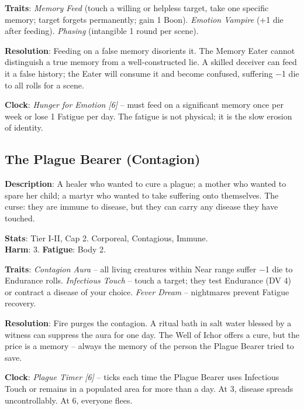 \noindent\textbf{Traits}: 
\emph{Memory Feed} (touch a willing or helpless target, take one specific memory; target forgets permanently; gain 1 Boon). \emph{Emotion Vampire} (+1 die after feeding). \emph{Phasing} (intangible 1 round per scene).

\noindent\textbf{Resolution}: Feeding on a false memory disorients it. The Memory Eater cannot distinguish a true memory from a well-constructed lie. A skilled deceiver can feed it a false history; the Eater will consume it and become confused, suffering −1 die to all rolls for a scene.

\noindent\textbf{Clock}: \emph{Hunger for Emotion [6]} -- must feed on a significant memory once per week or lose 1 Fatigue per day. The fatigue is not physical; it is the slow erosion of identity.


\subsection*{The Plague Bearer (Contagion)}

\noindent\textbf{Description}: A healer who wanted to cure a plague; a mother who wanted to spare her child; a martyr who wanted to take suffering onto themselves. The curse: they are immune to disease, but they can carry any disease they have touched.

\noindent\textbf{Stats}: Tier I-II, Cap 2. Corporeal, Contagious, Immune.\\
\textbf{Harm}: 3. \textbf{Fatigue}: Body 2.

\noindent\textbf{Traits}: 
\emph{Contagion Aura} -- all living creatures within Near range suffer −1 die to Endurance rolls. \emph{Infectious Touch} -- touch a target; they test Endurance (DV 4) or contract a disease of your choice. \emph{Fever Dream} -- nightmares prevent Fatigue recovery.

\noindent\textbf{Resolution}: Fire purges the contagion. A ritual bath in salt water blessed by a witness can suppress the aura for one day. The Well of Ichor offers a cure, but the price is a memory -- always the memory of the person the Plague Bearer tried to save.

\noindent\textbf{Clock}: \emph{Plague Timer [6]} -- ticks each time the Plague Bearer uses Infectious Touch or remains in a populated area for more than a day. At 3, disease spreads uncontrollably. At 6, everyone flees.


